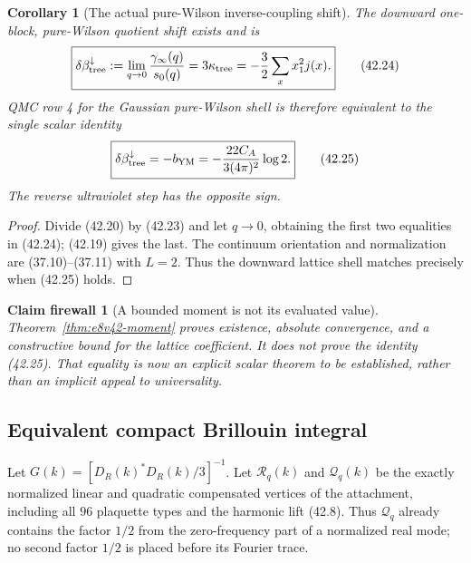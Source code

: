 \documentclass[11pt,oneside]{book}
\newtheorem{corollary}[theorem]{Corollary}
\newtheorem{firewall}[theorem]{Claim firewall}
\theoremstyle{definition}
\theoremstyle{remark}
\begin{document}
\begin{corollary}[The actual pure-Wilson inverse-coupling shift]
\label{cor:e8v42-tree-shift}
The downward one-block, pure-Wilson quotient shift exists and is
\[
 \boxed{
 \delta\beta_{\rm tree}^{\downarrow}
 :=\lim_{q\to0}\frac{\gamma_\infty(q)}{s_0(q)}
 =3\kappa_{\rm tree}
 =-\frac32\sum_xx_1^2j(x).}                                    \tag{42.24}
\]
QMC row 4 for the Gaussian pure-Wilson shell is therefore equivalent
to the single scalar identity
\[
 \boxed{
 \delta\beta_{\rm tree}^{\downarrow}=-b_{\rm YM}
 =-\frac{22C_A}{3(4\pi)^2}\log2.}                              \tag{42.25}
\]
The reverse ultraviolet step has the opposite sign.
\end{corollary}

\begin{proof}
Divide (42.20) by (42.23) and let \(q\to0\), obtaining the first two
equalities in (42.24); (42.19) gives the last.  The continuum
orientation and normalization are (37.10)--(37.11) with \(L=2\).
Thus the downward lattice shell matches precisely when (42.25)
holds.
\end{proof}

\begin{firewall}[A bounded moment is not its evaluated value]
\label{fire:e8v42-moment-not-value}
Theorem~\ref{thm:e8v42-moment} proves existence, absolute
convergence, and a constructive bound for the lattice coefficient.
It does not prove the identity (42.25).  That equality is now an
explicit scalar theorem to be established, rather than an implicit
appeal to universality.
\end{firewall}

\subsection{Equivalent compact Brillouin integral}

Let \(G(k)=[D_R(k)^*D_R(k)/3]^{-1}\).  Let
\(\mathcal R_q(k)\) and \(\mathcal Q_q(k)\) be the exactly normalized
linear and quadratic compensated vertices of the attachment,
including all \(96\) plaquette types and the harmonic lift (42.8).
Thus \(\mathcal Q_q\) already contains the factor \(1/2\) from the
zero-frequency part of a normalized real mode; no second factor
\(1/2\) is placed before its Fourier trace.
\end{document}
